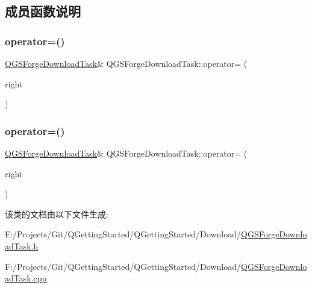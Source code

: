 \subsection{成员函数说明}
\mbox{\label{class_q_g_s_forge_download_task_add8b0d65a43ebf5c173994f6550858f0}} 
\subsubsection{\texorpdfstring{operator=()}{operator=()}\hspace{0.1cm}{\footnotesize\ttfamily [1/2]}}
{\footnotesize\ttfamily \mbox{\hyperlink{class_q_g_s_forge_download_task}{Q\+G\+S\+Forge\+Download\+Task}}\& Q\+G\+S\+Forge\+Download\+Task\+::operator= (\begin{DoxyParamCaption}\item[{const \mbox{\hyperlink{class_q_g_s_forge_download_task}{Q\+G\+S\+Forge\+Download\+Task}} \&}]{right }\end{DoxyParamCaption})\hspace{0.3cm}{\ttfamily [delete]}}

\mbox{\label{class_q_g_s_forge_download_task_a66efc25f33ecc89dd074a15b1b1ebab4}} 
\subsubsection{\texorpdfstring{operator=()}{operator=()}\hspace{0.1cm}{\footnotesize\ttfamily [2/2]}}
{\footnotesize\ttfamily \mbox{\hyperlink{class_q_g_s_forge_download_task}{Q\+G\+S\+Forge\+Download\+Task}}\& Q\+G\+S\+Forge\+Download\+Task\+::operator= (\begin{DoxyParamCaption}\item[{\mbox{\hyperlink{class_q_g_s_forge_download_task}{Q\+G\+S\+Forge\+Download\+Task}} \&\&}]{right }\end{DoxyParamCaption})\hspace{0.3cm}{\ttfamily [delete]}}



该类的文档由以下文件生成\+:\begin{DoxyCompactItemize}
\item 
F\+:/\+Projects/\+Git/\+Q\+Getting\+Started/\+Q\+Getting\+Started/\+Download/\mbox{\hyperlink{_q_g_s_forge_download_task_8h}{Q\+G\+S\+Forge\+Download\+Task.\+h}}\item 
F\+:/\+Projects/\+Git/\+Q\+Getting\+Started/\+Q\+Getting\+Started/\+Download/\mbox{\hyperlink{_q_g_s_forge_download_task_8cpp}{Q\+G\+S\+Forge\+Download\+Task.\+cpp}}\end{DoxyCompactItemize}
